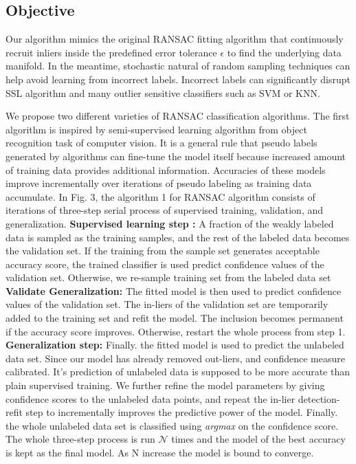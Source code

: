 \documentclass[a4paper, times, 12pt, ,onecolumn,oneside,top=1.0cm,bottom=1.0cm,left=1.0 cm,right=1cm]{article}
\begin{document}
\subsection{Objective}
Our algorithm mimics the original RANSAC fitting algorithm that continuously recruit inliers inside the predefined error tolerance $\epsilon$ to find the underlying data manifold. In the meantime, stochastic natural of random sampling techniques can help avoid learning from incorrect labels. Incorrect labels can significantly disrupt SSL algorithm and many outlier sensitive classifiers such as SVM or KNN. 

We propose two different varieties of RANSAC classification algorithms. The first algorithm is inspired by semi-supervised learning algorithm from object recognition task of computer vision. It is a general rule that pseudo labels generated by algorithms can fine-tune the model itself because increased amount of training data provides additional information. Accuracies of these models improve incrementally over iterations of pseudo labeling as training data accumulate. 
 In Fig. 3, the algorithm 1 for RANSAC algorithm consists of iterations of three-step serial process of supervised training, validation, and generalization. \textbf{Supervised learning step :} A fraction of the weakly labeled data is sampled as the training samples, and the rest of the labeled data becomes the validation set. If the training from the sample set generates acceptable accuracy score, the trained classifier is used predict confidence values of the validation set. Otherwise, we re-sample training set from the labeled data set \textbf{Validate Generalization:} The fitted model is then used to predict confidence values of the validation set. The in-liers of the validation set are temporarily added to the training set and refit the model. The inclusion becomes permanent if the accuracy score improves. Otherwise, restart the whole process from step 1. \textbf{Generalization step:} Finally. the fitted model is used to predict the unlabeled data set. Since our model has already removed out-liers, and confidence measure calibrated. It's prediction of unlabeled data is supposed to be more accurate than plain supervised training. We further refine the model parameters by giving confidence scores to the unlabeled data points, and repeat the in-lier detection-refit step to incrementally improves the predictive power of the model. Finally. the whole unlabeled data set is classified using \textit{argmax} on the confidence score. The whole three-step process is run $\mathcal{N}$ times and the model of the best accuracy is kept as the final model. As N increase the model is bound to converge.   
\end{document}
